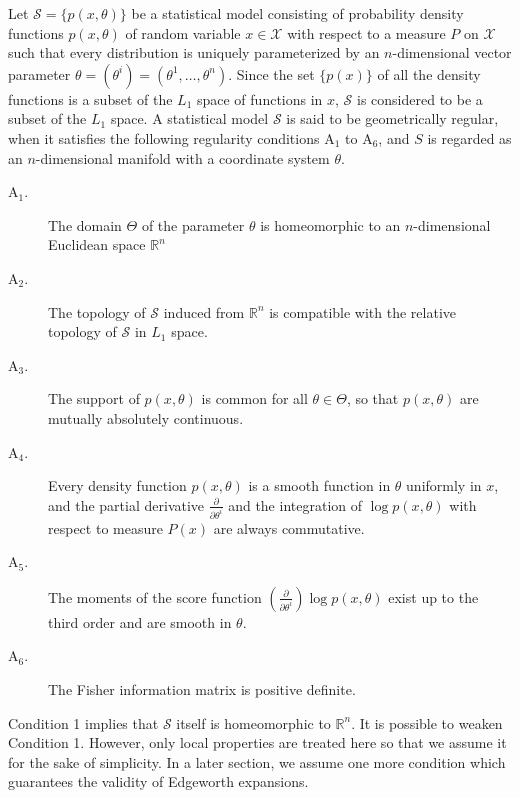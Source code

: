 \documentclass[11pt]{article}
\begin{document}
Let $\mathcal{S} = \{p (x,\theta)\}$ be a statistical model consisting of probability
density functions $p(x, \theta)$ of random variable $x \in \mathcal{X}$ with respect to a measure $P$ on
$\mathcal{X}$ such that every distribution is uniquely parameterized by an $n$-dimensional
vector parameter $\theta = (\theta^i) = (\theta^1, \hdots, \theta^n)$.  Since the set $\{p(x)\}$ of all the
density functions is a subset of the $L_1$ space of functions in $x$, $\mathcal{S}$ is
considered to be a subset of the $L_1$ space.  A statistical model $\mathcal{S}$ is said to be
geometrically regular, when it satisfies the following regularity conditions
$\text{A}_1$ to $\text{A}_6$, and $S$ is regarded as an $n$-dimensional manifold with a coordinate system $\theta$.

\begin{description}
\item[$\text{A}_1$.] The domain $\Theta$ of the parameter $\theta$ is homeomorphic to an
$n$-dimensional Euclidean space $\mathbb{R}^n$
\item[$\text{A}_2$.] The topology of $\mathcal{S}$ induced from $\mathbb{R}^n$ is compatible with the
relative topology of $\mathcal{S}$ in $L_1$ space.
\item[$\text{A}_3$.] The support of $p(x, \theta)$ is common for all $\theta \in \Theta$, so that $p(x,\theta)$
are mutually absolutely continuous.
\item[$\text{A}_4$.] Every density function $p(x, \theta)$ is a smooth function in $\theta$ uniformly
in $x$, and the partial derivative $\frac{\partial}{\partial \theta^i}$ and the integration of $\log p(x, \theta)$
with respect to measure $P(x)$ are always commutative.
\item[$\text{A}_5$.] The moments of the score function $(\frac{\partial}{\partial \theta^i}) \log p(x, \theta)$ exist
up to the third order and are smooth in $\theta$.
\item[$\text{A}_6$.] The Fisher information matrix is positive definite.
\end{description}

Condition 1 implies that $\mathcal{S}$ itself is homeomorphic to $\mathbb{R}^n$.  It is
possible to weaken Condition 1.  However, only local properties are treated
here so that we assume it for the sake of simplicity.  In a later section, we
assume one more condition which guarantees the validity of Edgeworth expansions.
\end{document}
